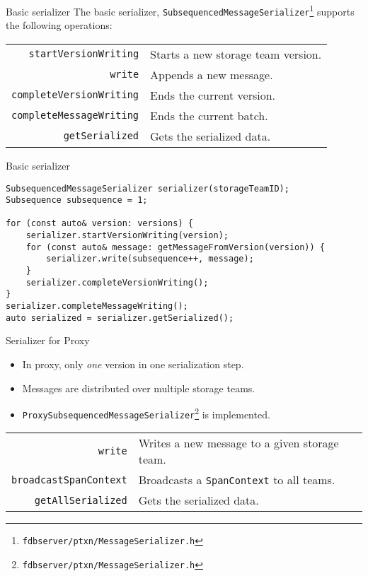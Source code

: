 \documentclass[9pt]{beamer}
\begin{document}
    \begin{frame}{Basic serializer}
        The basic serializer, \texttt{SubsequencedMessageSerializer}\footnote{\texttt{fdbserver/ptxn/MessageSerializer.h}} supports the following operations:

        \begin{center}
        \begin{tabular}{rl}
            \texttt{startVersionWriting} & Starts a new storage team version. \\
            \texttt{write} & Appends a new message. \\
            \texttt{completeVersionWriting} & Ends the current version. \\
            \texttt{completeMessageWriting} & Ends the current batch. \\
            \texttt{getSerialized} & Gets the serialized data.
        \end{tabular}
    \end{center}
    \end{frame}

    \begin{frame}[fragile]{Basic serializer}
        \begin{lstlisting}
SubsequencedMessageSerializer serializer(storageTeamID);
Subsequence subsequence = 1;

for (const auto& version: versions) {
    serializer.startVersionWriting(version);
    for (const auto& message: getMessageFromVersion(version)) {
        serializer.write(subsequence++, message);
    }
    serializer.completeVersionWriting();
}
serializer.completeMessageWriting();
auto serialized = serializer.getSerialized();
        \end{lstlisting}
    \end{frame}

    \begin{frame}{Serializer for Proxy}
        \begin{itemize}
            \item In proxy, only \emph{one} version in one serialization step.
            \item Messages are distributed over multiple storage teams.
            \item \texttt{ProxySubsequencedMessageSerializer}\footnote{\texttt{fdbserver/ptxn/MessageSerializer.h}} is implemented.
        \end{itemize}
        \begin{center}
            \begin{tabular}{rl}
                \texttt{write} & Writes a new message to a given storage team. \\
                \texttt{broadcastSpanContext} & Broadcasts a \texttt{SpanContext} to all teams. \\
                \texttt{getAllSerialized} & Gets the serialized data.
            \end{tabular}
        \end{center}
    \end{frame}
\end{document}
